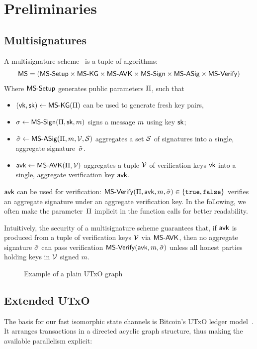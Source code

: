 \section{Preliminaries}\label{sec:prel}

\subsection{Multisignatures}\label{sec:multisig}

A multisignature scheme~\cite{itakura1983public,CCS:MicOhtRey01} is a
tuple of algorithms:
$$
\mathsf{MS} = (\mathsf{MS\textsf{-}{}Setup} \times \allowbreak\mathsf{MS\textsf{-}{}KG} \times \allowbreak\mathsf{MS\textsf{-}{}AVK} \times \allowbreak
\mathsf{MS\textsf{-}{}Sign} \times \allowbreak\mathsf{MS\textsf{-}{}ASig} \times \allowbreak\mathsf{MS\textsf{-}{}Verify})
$$
Where $\mathsf{MS\textsf{-}{}Setup}$ generates public parameters $\Pi$, such that
\begin{itemize}
  \item $(\mathsf{vk},\mathsf{sk}) \gets \mathsf{MS\textsf{-}{}KG}(\Pi)$ can be used to generate fresh key pairs,
  \item $\sigma \gets \mathsf{MS\textsf{-}{}Sign}(\Pi,\mathsf{sk},m)$ signs  a message $m$ using key $\mathsf{sk}$;
  \item $\tilde \sigma \gets \mathsf{MS\textsf{-}{}ASig}(\Pi,m,\mathcal V,\mathcal S)$ aggregates a
    set $\mathcal S$ of signatures into a single, aggregate signature~$\tilde \sigma$.
  \item $\mathsf{avk} \gets \mathsf{MS\textsf{-}{}AVK}(\Pi,\mathcal V)$ aggregates
  a tuple $\mathcal V$ of verification keys $\mathsf{vk}$ into a single,
  aggregate verification key $\mathsf{avk}$.
\end{itemize}
  $\mathsf{avk}$ can be used for verification:
  $\mathsf{MS\textsf{-}{}Verify}(\Pi,\mathsf{avk},m,\tilde \sigma) \in \{\mathtt{true},\mathtt{false}\}$
  verifies an aggregate signature under an aggregate verification key.
  In the following, we often make the parameter~$\Pi$ implicit in the
    function calls for better readability.

  Intuitively, the security of a multisignature scheme guarantees
  that, if $\mathsf{avk}$ is produced from a tuple of verification keys
  $\mathcal V$ via $\mathsf{MS\textsf{-}{}AVK}$, then no aggregate signature $\tilde \sigma$ can
  pass verification $\mathsf{MS\textsf{-}{}Verify}(\mathsf{avk},m,\tilde \sigma)$ unless all
  honest parties holding keys in $\mathcal V$ signed $m$.

\begin{figure}[t]
  \centering
  \caption{Example of a plain UTxO graph}
  \label{fig:utxo-graph}
\end{figure}

\subsection{Extended UTxO}
The basis for our fast isomorphic state channels is Bitcoin's UTxO ledger model~\cite{formal-model-of-bitcoin-transactions,Zahnentferner18-UTxO}. It arranges transactions in a directed acyclic graph structure, thus making the available parallelism explicit: 

